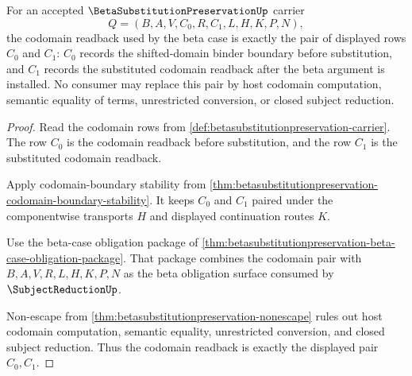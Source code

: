 \begin{theorem}
\label{thm:beta-substitution-preservation-codomain-readback}
For an accepted $\BetaSubstitutionPreservationUp$ carrier
$$
Q=(B,A,V,C_0,R,C_1,L,H,K,P,N),
$$
the codomain readback used by the beta case is exactly the pair of displayed rows $C_0$ and $C_1$: $C_0$ records the shifted-domain binder boundary before substitution, and $C_1$ records the substituted codomain readback after the beta argument is installed. No consumer may replace this pair by host codomain computation, semantic equality of terms, unrestricted conversion, or closed subject reduction.
\end{theorem}
\begin{proof}
Read the codomain rows from \autoref{def:betasubstitutionpreservation-carrier}. The row $C_0$ is the codomain readback before substitution, and the row $C_1$ is the substituted codomain readback.

Apply codomain-boundary stability from \autoref{thm:betasubstitutionpreservation-codomain-boundary-stability}. It keeps $C_0$ and $C_1$ paired under the componentwise transports $H$ and displayed continuation routes $K$.

Use the beta-case obligation package of \autoref{thm:betasubstitutionpreservation-beta-case-obligation-package}. That package combines the codomain pair with $B,A,V,R,L,H,K,P,N$ as the beta obligation surface consumed by $\SubjectReductionUp$.

Non-escape from \autoref{thm:betasubstitutionpreservation-nonescape} rules out host codomain computation, semantic equality, unrestricted conversion, and closed subject reduction. Thus the codomain readback is exactly the displayed pair $C_0,C_1$.
\end{proof}

